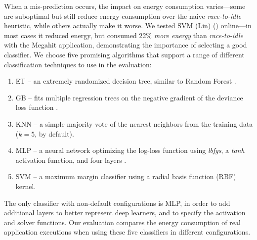 When a mis-prediction occurs, the impact on energy consumption varies---some are suboptimal but still reduce energy consumption over the naive \emph{race-to-idle} heuristic, while others actually make it worse.
We tested SVM (Lin) () online---in most cases it reduced energy, but consumed 22\% \emph{more energy} than \emph{race-to-idle} with the Megahit application, demonstrating the importance of selecting a good classifier.
We choose five promising algorithms that support a range of different classification techniques to use in the evaluation:
\begin{enumerate}
\item ET -- an extremely randomized decision tree, similar to Random Forest \cite{Geurts2006ExtraTrees}.
\item GB -- fits multiple regression trees on the negative gradient of the deviance loss function \cite{scikit-learn, friedman2001GradientBoosting}.%
\item KNN -- a simple majority vote of the nearest neighbors from the training data ($k=5$, by default).
\item MLP -- a neural network optimizing the log-loss function using \emph{lbfgs}, a \emph{tanh} activation function, and four layers \cite{HintonMultiLayerPerceptron}.
\item SVM -- a maximum margin classifier using a radial basis function (RBF) kernel.
\end{enumerate}
The only classifier with non-default configurations is MLP, in order to add additional layers to better represent deep learners, and to specify the activation and solver functions.
Our evaluation compares the energy consumption of real application executions when using these five classifiers in different configurations.
